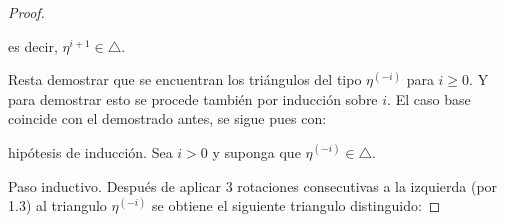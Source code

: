 \documentclass{article}
\begin{document}
\begin{enumerate}[label=\textbf{Ej \arabic*.}]
\begin{proof}
			\begin{center}
			\end{center}
			es decir, $\eta^{i+1}\in \triangle$.
			
			\bigskip
			
			Resta demostrar que se encuentran los triángulos del tipo $\eta^{(-i)}$ para $i\geq 0$. Y para demostrar esto se procede también por inducción sobre $i$. El caso base coincide con el demostrado antes, se sigue pues con:  
			
			\bigskip
			
			hipótesis de inducción. Sea $i>0$ y suponga que $\eta^{(-i)}\in \triangle$. 
			
			\bigskip
			
			Paso inductivo. Después de aplicar 3 rotaciones consecutivas a la izquierda (por 1.3) al triangulo $\eta^{(-i)}$ se obtiene el siguiente triangulo distinguido:
			

\end{proof}
\end{enumerate}
\end{document}
